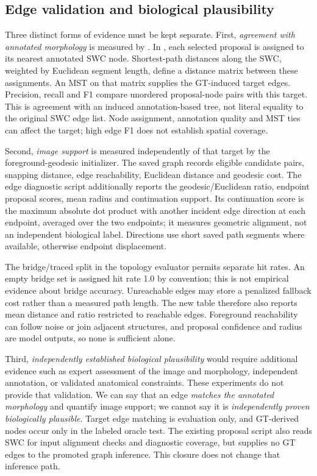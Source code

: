 \documentclass[11pt]{article}
\begin{document}
\subsection{Edge validation and biological plausibility}

Three distinct forms of evidence must be kept separate. First,
\emph{agreement with annotated morphology} is measured by
. In
, each selected proposal is
assigned to its nearest annotated SWC node. Shortest-path distances along the
SWC, weighted by Euclidean segment length, define a distance matrix between
these assignments. An MST on that matrix supplies the GT-induced target edges.
Precision, recall and F1 compare unordered proposal-node pairs with this target.
This is agreement with an induced annotation-based tree, not literal equality
to the original SWC edge list. Node assignment, annotation quality and MST ties
can affect the target; high edge F1 does not establish spatial coverage.

Second, \emph{image support} is measured independently of that target by the
foreground-geodesic initializer. The saved graph records eligible candidate
pairs, snapping distance, edge reachability, Euclidean distance and geodesic
cost. The edge diagnostic script additionally reports the geodesic/Euclidean
ratio, endpoint proposal scores, mean radius and continuation support. Its
continuation score is the maximum absolute dot product with another incident
edge direction at each endpoint, averaged over the two endpoints; it measures
geometric alignment, not an independent biological label. Directions use short
saved path segments where available, otherwise endpoint displacement.

The bridge/traced split in the topology evaluator permits separate hit rates.
An empty bridge set is assigned hit rate 1.0 by convention; this is not empirical
evidence about bridge accuracy. Unreachable edges may store a penalized fallback
cost rather than a measured path length. The new table therefore also reports
mean distance and ratio restricted to reachable edges. Foreground reachability
can follow noise or join adjacent structures, and proposal confidence and radius
are model outputs, so none is sufficient alone.

Third, \emph{independently established biological plausibility} would require
additional evidence such as expert assessment of the image and morphology,
independent annotation, or validated anatomical constraints. These experiments
do not provide that validation. We can say that an edge \emph{matches the
annotated morphology} and quantify image support; we cannot say it is
\emph{independently proven biologically plausible}. Target edge matching is
evaluation only, and GT-derived nodes occur only in the labeled oracle test.
The existing proposal script also reads SWC for input alignment checks and
diagnostic coverage, but supplies no GT edges to the promoted graph inference.
This closure does not change that inference path.
\end{document}
